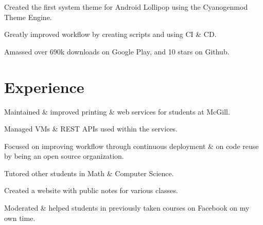 \documentclass[]{allanwang-resume}
\begin{document}
\begin{minipage}[t]{0.66\textwidth}
	\begin{tightemize}
		\item Created the first system theme for Android Lollipop using the Cyanogenmod Theme Engine.
		\item Greatly improved workflow by creating scripts and using CI \& CD.
		\item Amassed over 690k downloads on Google Play, and 10 stars on Github.
	\end{tightemize}

	\sectionsep
	\section{Experience}

	\begin{tightemize}
		\item Maintained \& improved printing \& web services for students at McGill.
		\item Managed VMs \& REST APIs used within the services.
		\item Focused on improving workflow through continuous deployment \& on code reuse by being an open source organization.
	\end{tightemize}

	\begin{tightemize}
		\item Tutored other students in Math \& Computer Science.
		\item Created a website with public notes for various classes.
		\item Moderated \& helped students in previously taken courses on Facebook on my own time.
	\end{tightemize}

\end{minipage}
\end{document}
